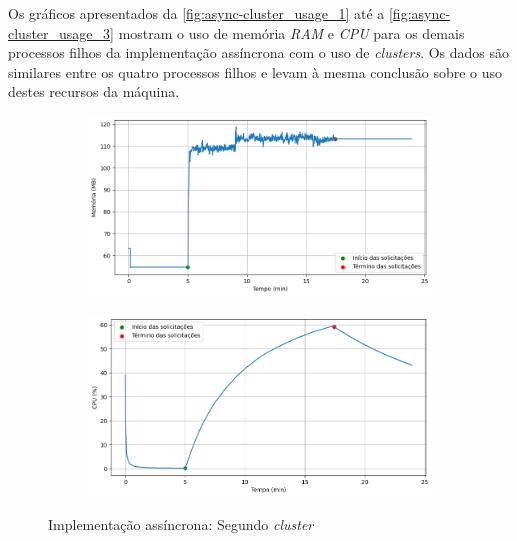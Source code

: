 \documentclass[12pt]{article}
\begin{document}
Os gráficos apresentados da \autoref{fig:async-cluster_usage_1} até a 
\autoref{fig:async-cluster_usage_3} mostram o uso de memória \textit{RAM}
e \textit{CPU} para os demais processos filhos da implementação assíncrona com o uso
de \textit{clusters}. Os dados são similares entre os quatro processos filhos e 
levam à mesma conclusão sobre o uso destes recursos da máquina.


\begin{figure}[H]
	\centering
	\begin{subfigure}[H]{0.45\textwidth}
			\centering
			\label{fig:async-cluster_usage_1a}
			\includegraphics[width=1\textwidth]{images/pt-br/results/async-cluster_memory_usage_1.png}
	\end{subfigure}
	\hfill%
	\begin{subfigure}[H]{0.45\textwidth}
			\centering
			\label{fig:async-cluster_usage_1b}
			\includegraphics[width=1\textwidth]{images/pt-br/results/async-cluster_cpu_usage_1.png}
	\end{subfigure}
	
	\caption{Implementação assíncrona: Segundo \textit{cluster}}\label{fig:async-cluster_usage_1}
\end{figure}
\end{document}
